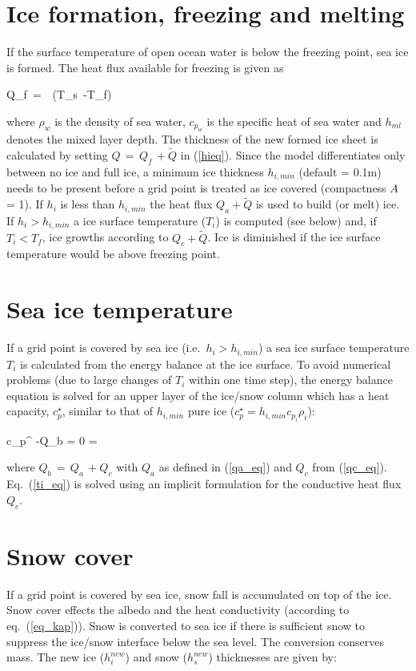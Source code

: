 \section*{Ice formation, freezing and melting}
If the surface temperature of open ocean water is below the freezing point,
sea ice is formed. The heat flux available for freezing is given as

\be
Q_f\, =\, {\di {} \, (T_s\, -T_f)}
\ee

where $\rho_w$ is the density of sea water,
$c_{p_w}$ is the specific heat of sea water and
$h_{ml}$ denotes the mixed layer depth. The thickness of the new 
formed ice sheet is calculated by setting $Q\, =\, Q_f\, +\tilde{Q}$
in (\ref{hieq}). Since the model differentiates only between 
no ice and full ice, a
minimum ice thickness $h_{i,min}$ (default = 0.1m) needs to be present 
before a grid point is treated as ice covered (compactness $A$  = 1). 
If $h_i$ is less than $h_{i,min}$ the heat flux $Q_a+\tilde{Q}$ is used 
to build (or melt) ice. If $h_i > h_{i,min}$ a ice surface temperature 
($T_i$) is computed (see below) and, if $T_i < T_f$, ice growths according 
to $Q_c + \tilde{Q}$. Ice is diminished if the ice surface temperature 
would be above freezing point. 


\section*{Sea ice temperature}
If a grid point is covered by sea ice (i.e.~$h_i > h_{i,min}$) a sea ice surface temperature $T_i$ is calculated from the energy balance
at the ice surface. To avoid numerical problems (due to large changes of $T_i$ within one time step), the energy balance equation is solved for an upper layer of the ice/snow column which has a heat capacity, $c_p^{\star}$, similar to that of $h_{i,min}$ pure ice ($c_p^{\star}=h_{i,min} c_{p_i} \rho_i$):

\be
{\di c_p^{\star}
 -Q_b = 0 \Rightarrow 
{} = 
}
\label{ti_eq}
\ee

where $Q_b\, =\, Q_a\, +Q_c$ with $Q_a$ as defined in (\ref{qa_eq}) and $Q_c$ from (\ref{qc_eq}). Eq.~(\ref{ti_eq}) is solved using an implicit formulation for the conductive heat flux $Q_c$.

\section*{Snow cover}
If a grid point is covered by sea ice, snow fall is accumulated on top of the ice. Snow cover effects the albedo and the heat conductivity (according to eq.~(\ref{eq_kap})). Snow is converted to sea ice if there is sufficient snow to suppress the ice/snow interface below the sea level. The conversion conserves mass. The new ice ($h_i^{new}$) and snow ($h_s^{new}$) thicknesses are given by:

